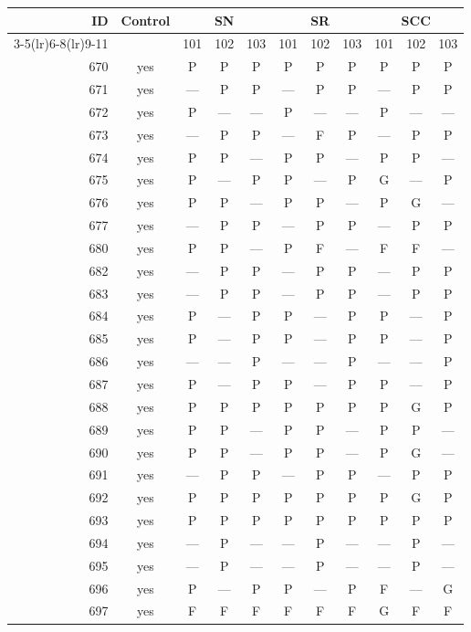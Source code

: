 \begin{table}[p]\centering\small
\begin{tabular*}{\textwidth}{@{\extracolsep{\fill}}rc*{9}{c}@{}}\toprule
ID & Control & \multicolumn{3}{c}{SN} & \multicolumn{3}{c}{SR} & \multicolumn{3}{c}{SCC}\\
\cmidrule(lr){3-5}\cmidrule(lr){6-8}\cmidrule(lr){9-11}
 & & 101 & 102 & 103 & 101 & 102 & 103 & 101 & 102 & 103\\\midrule
670 & yes & P & P & P & P & P & P & P & P & P\\
671 & yes & — & P & P & — & P & P & — & P & P\\
672 & yes & P & — & — & P & — & — & P & — & —\\
673 & yes & — & P & P & — & F & P & — & P & P\\
674 & yes & P & P & — & P & P & — & P & P & —\\
675 & yes & P & — & P & P & — & P & G & — & P\\
676 & yes & P & P & — & P & P & — & P & G & —\\
677 & yes & — & P & P & — & P & P & — & P & P\\
680 & yes & P & P & — & P & F & — & F & F & —\\
682 & yes & — & P & P & — & P & P & — & P & P\\
683 & yes & — & P & P & — & P & P & — & P & P\\
684 & yes & P & — & P & P & — & P & P & — & P\\
685 & yes & P & — & P & P & — & P & P & — & P\\
686 & yes & — & — & P & — & — & P & — & — & P\\
687 & yes & P & — & P & P & — & P & P & — & P\\
688 & yes & P & P & P & P & P & P & P & G & P\\
689 & yes & P & P & — & P & P & — & P & P & —\\
690 & yes & P & P & — & P & P & — & P & G & —\\
691 & yes & — & P & P & — & P & P & — & P & P\\
692 & yes & P & P & P & P & P & P & P & G & P\\
693 & yes & P & P & P & P & P & P & P & P & P\\
694 & yes & — & P & — & — & P & — & — & P & —\\
695 & yes & — & P & — & — & P & — & — & P & —\\
696 & yes & P & — & P & P & — & P & F & — & G\\
697 & yes & F & F & F & F & F & F & G & F & F\\

\end{tabular*}
\end{table}
